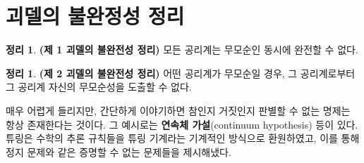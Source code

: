 \documentclass[b5paper, 10pt]{book}
\theoremstyle{definition}
\newtheorem{thm}[defn]{정리}
\begin{document}
\section{괴델의 불완정성 정리}
\begin{thm}
    \textbf{(제 1 괴델의 불완전성 정리)} 모든 공리계는 무모순인 동시에 완전할 수 없다.
\end{thm}
\begin{thm}
    \textbf{(제 2 괴델의 불완전성 정리)} 어떤 공리계가 무모순일 경우, 그 공리계로부터 그 공리계 자신의
    무모순성을 도출할 수 없다. 
\end{thm}
매우 어렵게 들리지만, 간단하게 이야기하면 참인지 거짓인지 판별할 수 없는 명제는 항상 존재한다는 것이다. 그
예시로는 \textbf{연속체 가설}(continuum hypothesis) 등이 있다. 튜링은 수학의 추론 규칙들을 튜링 기계라는
기계적인 방식으로 환원하였고, 이를 통해 정지 문제와 같은 증명할 수 없는 문제들을 제시해냈다.


\nocite{*}
\end{document}
